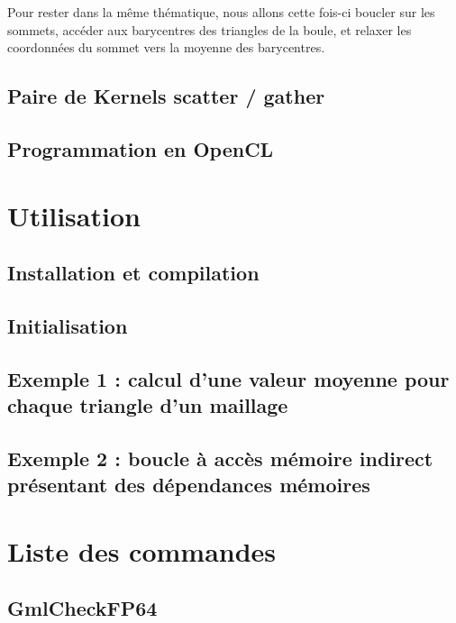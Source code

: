 \documentclass[a4paper,12pt]{article}
\begin{document}
Pour rester dans la même thématique, nous allons cette fois-ci boucler sur les sommets, accéder aux barycentres des triangles de la boule, et relaxer les coordonnées du sommet vers la moyenne des barycentres.



\subsection{Paire de Kernels scatter / gather}

\subsection{Programmation en OpenCL}


%
%

\section{Utilisation}

\subsection{Installation et compilation}

\subsection{Initialisation}

\subsection{Exemple 1 : calcul d'une valeur moyenne pour chaque triangle d'un maillage}

\subsection{Exemple 2 : boucle à accès mémoire indirect présentant des dépendances mémoires}


%
%

\section{Liste des commandes}

\subsection{GmlCheckFP64}
\end{document}
